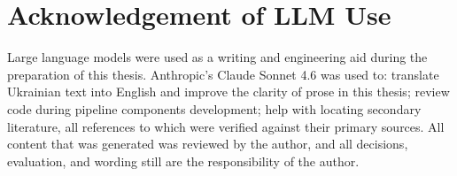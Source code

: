 \chapter*{Acknowledgement of LLM Use}

Large language models were used as a writing and engineering aid during the preparation of this thesis. Anthropic's Claude Sonnet 4.6 was used to: translate Ukrainian text into English and improve the clarity of prose in this thesis; review code during pipeline components development; help with locating secondary literature, all references to which were verified against their primary sources. All content that was generated was reviewed by the author, and all decisions, evaluation, and wording still are the responsibility of the author.